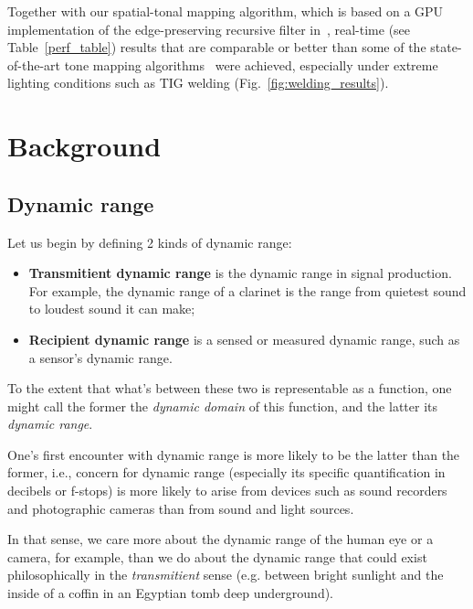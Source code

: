 Together with our spatial-tonal mapping algorithm, which is based on a GPU implementation of the 
edge-preserving recursive filter in~\cite{GastalOliveira2011DomainTransform}, real-time (see 
Table~\ref{perf_table}) results that are comparable or better than some of the state-of-the-art tone 
mapping algorithms~\cite{reinhard2002photographic,mantiuk2006perceptual,fattal2002gradient} 
were achieved, especially under extreme lighting conditions such as TIG welding 
(Fig.~\ref{fig:welding_results}).

\section{Background}
 
\subsection{Dynamic range}
Let us begin by defining 2 kinds of dynamic range:
\begin{itemize}
 
 \item 
       {\bf Transmitient dynamic range} is the
       dynamic range in signal production.
       For example, the dynamic range of a clarinet is the range from
       quietest sound to loudest sound it can make;
 \item 
 
       {\bf Recipient dynamic range} is a sensed or measured dynamic range,
       such as a sensor's dynamic range.
 
\end{itemize}
 
To the extent that what's between these two is representable as a function, one might call the former 
the {\em dynamic domain} of this function, and the latter its {\em dynamic range}.

One's first encounter with dynamic range is more likely to be the latter than the former, i.e., concern 
for dynamic range (especially its specific quantification in decibels or f-stops) is more likely to arise 
from devices such as sound recorders and photographic cameras than from sound and light sources.

In that sense, we care more about the dynamic range of the human eye or a camera, for example, 
than we do about the dynamic range that could exist philosophically in the {\em transmitient} sense 
(e.g. between bright sunlight and the inside of a coffin in an Egyptian tomb deep underground).

